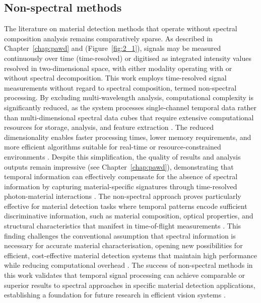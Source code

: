 \documentclass[12pt,a4paper,oneside]{report}
\begin{document}
\subsection{Non-spectral methods}
\label{subsec:non_spectral_methods}

The literature on material detection methods that operate without spectral composition analysis remains comparatively sparse. As described in Chapter~\ref{chap:pawd} and (Figure~\ref{fig:2_1}), signals may be measured continuously over time (time-resolved) or digitised as integrated intensity values resolved in two-dimensional space, with either modality operating with or without spectral decomposition. This work employs time-resolved signal measurements without regard to spectral composition, termed non-spectral processing. By excluding multi-wavelength analysis, computational complexity is significantly reduced, as the system processes single-channel temporal data rather than multi-dimensional spectral data cubes that require extensive computational resources for storage, analysis, and feature extraction \cite{su2016,becker2023,tafone2023}. The reduced dimensionality enables faster processing times, lower memory requirements, and more efficient algorithms suitable for real-time or resource-constrained environments \cite{su2016,becker2023,jungerman2022}. Despite this simplification, the quality of results and analysis outputs remain impressive (see Chapter~\ref{chap:pawd}), demonstrating that temporal information can effectively compensate for the absence of spectral information by capturing material-specific signatures through time-resolved photon-material interactions \cite{su2016,becker2023,tafone2023,yang2024}. The non-spectral approach proves particularly effective for material detection tasks where temporal patterns encode sufficient discriminative information, such as material composition, optical properties, and structural characteristics that manifest in time-of-flight measurements \cite{su2016,becker2023,tafone2023}. This finding challenges the conventional assumption that spectral information is necessary for accurate material characterisation, opening new possibilities for efficient, cost-effective material detection systems that maintain high performance while reducing computational overhead \cite{su2016,becker2023,tafone2023}. The success of non-spectral methods in this work validates that temporal signal processing can achieve comparable or superior results to spectral approaches in specific material detection applications, establishing a foundation for future research in efficient vision systems \cite{su2016,becker2023,tafone2023,yang2024}.
\end{document}
